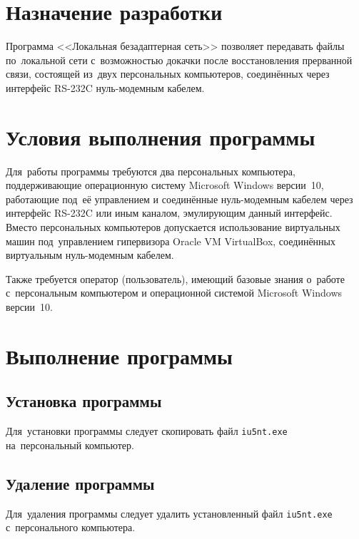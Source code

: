 \documentclass[a4paper,12pt]{article}
\begin{document}
\section{Назначение разработки}
Программа <<Локальная безадаптерная сеть>> позволяет передавать файлы по~локальной сети с~возможностью докачки после восстановления прерванной связи, состоящей из~двух персональных компьютеров, соединённых через интерфейс RS-232C нуль-модемным кабелем.

\section{Условия выполнения программы}
Для~работы программы требуются два персональных компьютера, поддерживающие операционную систему Microsoft Windows версии~10, работающие под~её управлением и соединённые нуль-модемным кабелем через интерфейс RS-232C или иным каналом, эмулирующим данный интерфейс. Вместо персональных компьютеров допускается использование виртуальных машин под~управлением гипервизора Oracle VM VirtualBox, соединённых виртуальным нуль-модемным кабелем.

Также требуется оператор (пользователь), имеющий базовые знания о~работе с~персональным компьютером и операционной системой Microsoft Windows версии~10.

\section{Выполнение программы}
\subsection{Установка программы}
Для~установки программы следует скопировать файл \texttt{iu5nt.exe} на~персональный компьютер.

\subsection{Удаление программы}
Для~удаления программы следует удалить установленный файл \texttt{iu5nt.exe} с~персонального компьютера.
\end{document}
